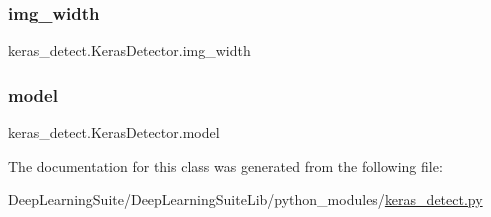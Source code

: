 \subsubsection{\texorpdfstring{img\+\_\+width}{img\_width}}
{\footnotesize\ttfamily keras\+\_\+detect.\+Keras\+Detector.\+img\+\_\+width}

\mbox{\label{classkeras__detect_1_1_keras_detector_a9f1a5aa144f6bc63ad0fbdb2ad4f1bb8}} 
\subsubsection{\texorpdfstring{model}{model}}
{\footnotesize\ttfamily keras\+\_\+detect.\+Keras\+Detector.\+model}



The documentation for this class was generated from the following file\+:\begin{DoxyCompactItemize}
\item 
Deep\+Learning\+Suite/\+Deep\+Learning\+Suite\+Lib/python\+\_\+modules/\hyperlink{keras__detect_8py}{keras\+\_\+detect.\+py}\end{DoxyCompactItemize}
